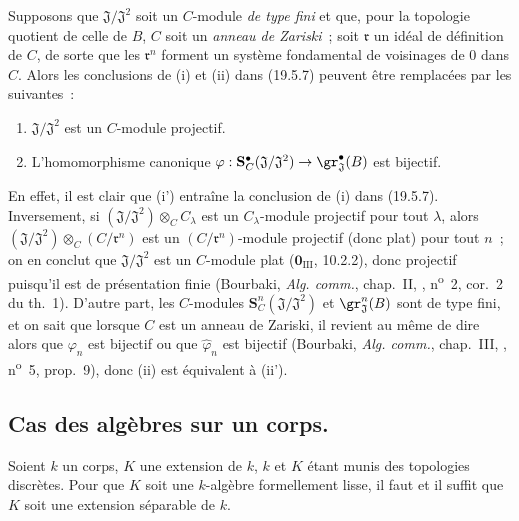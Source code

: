 \begin{remark}[19.5.8]
\label{0.19.5.8-fr}
Supposons que $\mathfrak J/\mathfrak J^2$ soit un $C$-module \emph{de type fini} et
que, pour la topologie quotient de celle de $B$, $C$ soit un \emph{anneau de Zariski}~;
soit $\mathfrak r$ un idéal de définition de $C$, de sorte que les
$\mathfrak r^n$ forment un système fondamental de voisinages de $0$ dans $C$.
Alors les conclusions de (i) et (ii) dans (19.5.7) peuvent être remplacées par
les suivantes~:
\begin{enumerate}
  \item[\rm(i')] $\mathfrak J/\mathfrak J^2$ est un $C$-module projectif.
  \item[\rm(ii')] L'homomorphisme canonique
  $\varphi:\mathbf S_C^\bullet(\mathfrak J/\mathfrak J^2)
  \to\gr_{\mathfrak J}^\bullet(B)$ est bijectif.
\end{enumerate}

En effet, il est clair que (i') entraîne la conclusion de (i) dans (19.5.7).
Inversement, si $(\mathfrak J/\mathfrak J^2)\otimes_C C_\lambda$ est un
$C_\lambda$-module projectif pour tout $\lambda$, alors
$(\mathfrak J/\mathfrak J^2)\otimes_C(C/\mathfrak r^n)$ est un
$(C/\mathfrak r^n)$-module projectif (donc plat) pour tout $n$~; on en conclut
que $\mathfrak J/\mathfrak J^2$ est un $C$-module plat
($\mathbf 0_{\mathrm{III}}$, 10.2.2), donc projectif puisqu'il est de
présentation finie (Bourbaki, \emph{Alg. comm.}, chap.~II, ,
n\textsuperscript{o}~2, cor.~2 du th.~1). D'autre part, les $C$-modules
$\mathbf S_C^n(\mathfrak J/\mathfrak J^2)$ et $\gr_{\mathfrak J}^n(B)$ sont
de type fini, et on sait que lorsque $C$ est un anneau de Zariski, il revient
au même de dire alors que $\varphi_n$ est bijectif ou que
$\widehat\varphi_n$ est bijectif (Bourbaki, \emph{Alg. comm.}, chap.~III,
, n\textsuperscript{o}~5, prop.~9), donc (ii) est équivalent à
(ii').
\end{remark}

\subsection{Cas des algèbres sur un corps.}
\label{subsection:0.19.6-fr}

\begin{theorem}[19.6.1) (Cohen]
\label{0.19.6.1-fr}
Soient $k$ un corps, $K$ une extension de $k$, $k$ et $K$
étant munis des topologies discrètes. Pour que $K$ soit une $k$-algèbre
formellement lisse, il faut et il suffit que $K$ soit une extension séparable
de $k$.
\end{theorem}

